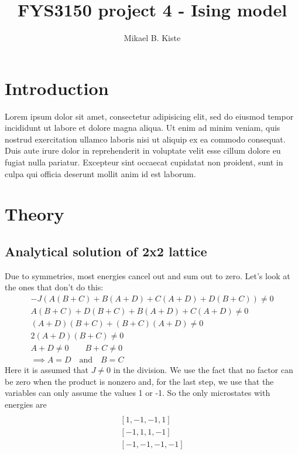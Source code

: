 \documentclass[a4paper, 12pt]{article}
\author{Mikael B. Kiste}
\title{FYS3150 project 4 - Ising model}
\begin{document}
	\maketitle
	
	
	\tableofcontents
	
	\newpage
	\section{Introduction}
	Lorem ipsum dolor sit amet, consectetur adipisicing elit, sed do eiusmod
	tempor incididunt ut labore et dolore magna aliqua. Ut enim ad minim veniam,
	quis nostrud exercitation ullamco laboris nisi ut aliquip ex ea commodo
	consequat. Duis aute irure dolor in reprehenderit in voluptate velit esse
	cillum dolore eu fugiat nulla pariatur. Excepteur sint occaecat cupidatat non
	proident, sunt in culpa qui officia deserunt mollit anim id est laborum.

	\newpage
	\section{Theory}
	
	\subsection{Analytical solution of 2x2 lattice}
	Due to symmetries, most energies cancel out and sum out to zero. Let's look at the ones that don't do this:
	\begin{align*}
		-J(A(B+C)+B(A+D)+C(A+D)+D(B+C)) \neq 0\\
		A(B+C)+D(B+C)+B(A+D)+C(A+D) \neq 0 \\
		(A+D)(B+C)+(B+C)(A+D) \neq 0 \\
		2(A+D)(B+C) \neq 0 \\
		A+D \neq 0 \qquad B+C \neq 0 \\
		\implies A=D \quad \mathrm{and} \quad B=C
	\end{align*}
	Here it is assumed that $J\neq 0$ in the division. We use the fact that no factor can be zero when the product is nonzero and, for the last step, we use that the variables can only assume the values 1 or -1.
	So the only microstates with energies are
	\begin{align*}
		[1,1,1,1]\\
		[1,-1,-1,1]\\
		[-1,1,1,-1]\\
		[-1,-1,-1,-1]
	\end{align*}
\end{document}
